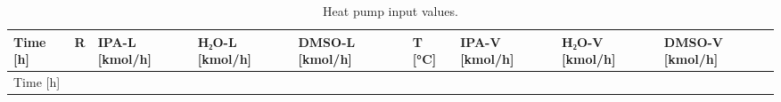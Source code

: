\begin{longtable}[]{@{}
  >{\raggedleft\arraybackslash}p{}
  >{\raggedleft\arraybackslash}p{}
  >{\raggedleft\arraybackslash}p{}
  >{\raggedleft\arraybackslash}p{}
  >{\raggedleft\arraybackslash}p{}
  >{\raggedleft\arraybackslash}p{}
  >{\raggedleft\arraybackslash}p{}
  >{\raggedleft\arraybackslash}p{}
  >{\raggedleft\arraybackslash}p{}@{}}
\caption{Heat pump input values.
\label{tab:Heat pump input values}}\tabularnewline
\toprule\noalign{}
\begin{minipage}[b]{\linewidth}\raggedleft
Time {[}h{]}
\end{minipage} & \begin{minipage}[b]{\linewidth}\raggedleft
R
\end{minipage} & \begin{minipage}[b]{\linewidth}\raggedleft
IPA-L {[}kmol/h{]}
\end{minipage} & \begin{minipage}[b]{\linewidth}\raggedleft
H₂O-L {[}kmol/h{]}
\end{minipage} & \begin{minipage}[b]{\linewidth}\raggedleft
DMSO-L {[}kmol/h{]}
\end{minipage} & \begin{minipage}[b]{\linewidth}\raggedleft
T {[}°C{]}
\end{minipage} & \begin{minipage}[b]{\linewidth}\raggedleft
IPA-V {[}kmol/h{]}
\end{minipage} & \begin{minipage}[b]{\linewidth}\raggedleft
H₂O-V {[}kmol/h{]}
\end{minipage} & \begin{minipage}[b]{\linewidth}\raggedleft
DMSO-V {[}kmol/h{]}
\end{minipage} \\
\midrule\noalign{}
\endfirsthead
\toprule\noalign{}
\begin{minipage}[b]{\linewidth}\raggedleft
Time {[}h{]}
\end{minipage} & \begin{minipage}[b]{\linewidth}\raggedleft

\end{minipage}
\end{longtable}
